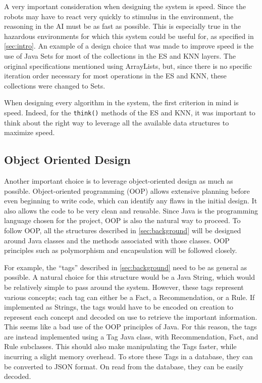 \documentclass[titlepage,11pt]{article}
\newcommand{\code}[1]{\texttt{#1}}
\begin{document}
A very important consideration when designing the system is speed. Since the robots may have to react very quickly to stimulus in the environment, the reasoning in the AI must be as fast as possible. This is especially true in the hazardous environments for which this system could be useful for, as specified in \autoref{sec:intro}. An example of a design choice that was made to improve speed is the use of Java Sets for most of the collections in the ES and KNN layers. The original specifications mentioned using ArrayLists, but, since there is no specific iteration order necessary for most operations in the ES and KNN, these collections were changed to Sets.

When designing every algorithm in the system, the first criterion in mind is speed. Indeed, for the \code{think()} methods of the ES and KNN, it was important to think about the right way to leverage all the available data structures to maximize speed.

\subsection{Object Oriented Design}

Another important choice is to leverage object-oriented design as much as possible. Object-oriented programming (OOP) allows extensive planning before even beginning to write code, which can identify any flaws in the initial design. It also allows the code to be very clean and reusable. Since Java is the programming language chosen for the project, OOP is also the natural way to proceed. To follow OOP, all the structures described in \autoref{sec:background} will be designed around Java classes and the methods associated with those classes. OOP principles such as polymorphism and encapsulation will be followed closely.

For example, the ``tags'' described in \autoref{sec:background} need to be as general as possible. A natural choice for this structure would be a Java String, which would be relatively simple to pass around the system. However, these tags represent various concepts; each tag can either be a Fact, a Recommendation, or a Rule. If implemented as Strings, the tags would have to be encoded on creation to represent each concept and decoded on use to retrieve the important information. This seems like a bad use of the OOP principles of Java. For this reason, the tags are instead implemented using a Tag Java class, with Recommendation, Fact, and Rule subclasses. This should also make manipulating the Tags faster, while incurring a slight memory overhead. To store these Tags in a database, they can be converted to JSON format. On read from the database, they can be easily decoded.
\end{document}
